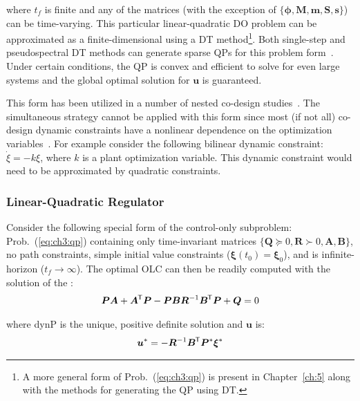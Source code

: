\noindent where $t_f$ is finite and any of the matrices (with the exception of $\{\bm{\phi}, \bm{M}, \bm{m}, \bm{S}, \bm{s}\}$) can be time-varying.
This particular linear-quadratic DO problem can be approximated as a finite-dimensional  using a DT method\footnote{A more general form of Prob.~(\ref{eq:ch3:qp}) is present in Chapter~\ref{ch:5} along with the methods for generating the QP using DT.}. Both single-step and pseudospectral DT methods can generate sparse QPs for this problem form~\cite{Herber2014a, Biegler2010a}.
Under certain conditions, the QP is convex and efficient to solve for even large systems and the global optimal solution for $\bm{u}$ is guaranteed.

This form has been utilized in a number of nested co-design studies~\cite{Herber2014a, Chilan2017a}.
The simultaneous strategy cannot be applied with this form since most (if not all) co-design dynamic constraints have a nonlinear dependence on the optimization variables~\cite{Fathy2001a}. For example consider the following bilinear dynamic constraint: $\dot{\xi} = - k \xi$, where $k$ is a plant optimization variable. This dynamic constraint would need to be approximated by quadratic constraints.

\subsubsection{Linear-Quadratic Regulator \label{sec:ch3:lqr}}

Consider the following special form of the control-only subproblem: Prob.~(\ref{eq:ch3:qp}) containing only time-invariant matrices $\{ {\bm{Q}} \succeq 0, {\bm{R}} \succ 0, {\bm{A}}, {\bm{B}} \}$, no path constraints, simple initial value constraints ($\bm{\xi}(t_0) = \bm{\xi}_0$), and is infinite-horizon ($t_f \to \infty$). The optimal OLC can then be readily computed with the solution of the :
\begin{align}
\label{eq:ch3:are}
\bm{P} {\bm{A}} + {\bm{A}}^{\mkern-1.5mu\mathsf{T}} \bm{P} - \bm{P} {\bm{B}} {\bm{R}}^{-1} {\bm{B}}^{\mkern-1.5mu\mathsf{T}} \bm{P} + {\bm{Q}} = 0
\end{align}

\noindent where \gls{dynP} is the unique, positive definite solution and $\bm{u}$ is:
\begin{align}
\bm{u}^* = - {\bm{R}}^{-1} {\bm{B}}^{\mkern-1.5mu\mathsf{T}} \bm{P}^* \bm{\xi}^*
\end{align}

